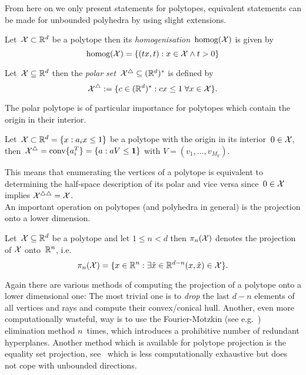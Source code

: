 %
\noindent\mysplit From here on we only present statements for polytopes, equivalent statements can be made for unbounded polyhedra by using slight extensions.
%
\begin{defi}
Let~$\mathcal X\subset\mathbb R^d$ be a polytope then its \emph{homogenisation}~$\text{homog}(\mathcal X)$ is given by
%
\begin{equation}
	\text{homog}(\mathcal X) = \{(tx,t):x\in\mathcal X\wedge t>0\}
\end{equation}
\end{defi}
%
\begin{defi}
Let~$\mathcal X\subseteq\mathbb R^d$ then the \emph{polar set}~$\mathcal X^\bigtriangleup\subseteq(\mathbb R^d)^\ast$ is defined by
%
\begin{equation}
	\mathcal X^\bigtriangleup := \{c\in(\mathbb R^d)^\ast:cx\leq1\;\forall x\in\mathcal X\}.
\end{equation}
\end{defi}
%
\noindent The polar polytope is of particular importance for polytopes which contain the origin in their interior.
%
\begin{thm}
Let~$\mathcal X\subset\mathbb R^d=\{x:a_ix\leq 1\}$ be a polytope with the origin in its interior~$0\in\mathcal X$, then~$\mathcal X^\bigtriangleup=\text{conv}\{a_i^T\}=\{a:aV\leq\mathbf{1}\}$ with $V=(v_1,\dots,v_{M_V})$.
\end{thm}
%
\noindent This means that enumerating the vertices of a polytope is equivalent to determining the half-space description of its polar and vice versa since~$0\in\mathcal X$ implies $\mathcal X^{\bigtriangleup\bigtriangleup}=\mathcal X$.
%
\\[1em]
%
An important operation on polytopes (and polyhedra in general) is the projection onto a lower dimension.
%
\begin{defi}
Let~$\mathcal X\subseteq\mathbb R^d$ be a polytope and let $1\leq n<d$ then $\pi_n(\mathcal X)$ denotes the projection of $\mathcal X$ onto~$\mathbb R^n$, i.e.
%
\begin{equation}
	\pi_n(\mathcal X) = \{x\in\mathbb R^n:\exists \hat x\in\mathbb R^{d-n} (x,\hat x)\in\mathcal X\}.
\end{equation}
\end{defi}
%
\noindent Again there are various methods of computing the projection of a polytope onto a lower dimensional one: 
%
The most trivial one is to \emph{drop} the last $d-n$ elements of all vertices and rays and compute their convex/conical hull.
%
Another, even more computationally wasteful, way is to use the Fourier-Motzkin (see e.g.~\cite{Ziegler:1995}) elimination method $n$~times, which introduces a prohibitive number of redundant hyperplanes.
%
Another method which is available for polytope projection is the equality set projection, see~\cite{Jones:2004} which is less computationally exhaustive but does not cope with unbounded directions.
